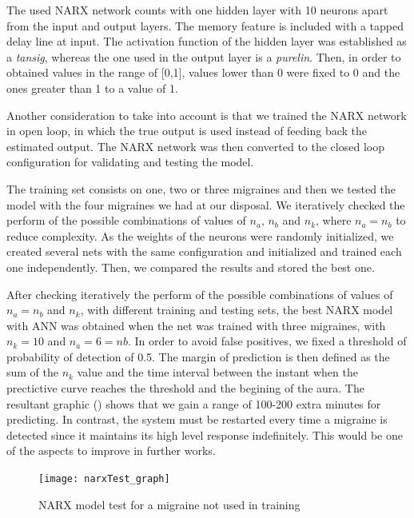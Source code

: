 The used NARX network counts with one hidden layer with 10 
neurons apart from the input and output layers. 
The memory feature is included with a tapped delay line at input. 
The activation function of the hidden layer was established as 
a \textit{tansig}, whereas the one used in the output layer is 
a \textit{purelin}. Then, in order to obtained values in the range of [0,1], values lower than 0 were fixed to 0 and the ones greater than 1 to a value of 1.

Another consideration to take into account is that we trained the 
NARX network in open loop, in which the true output is used instead 
of feeding back the estimated output. The NARX network was then 
converted to the closed loop configuration for validating and 
testing the model.

The training set consists on one, two or three migraines and then we tested the model with the four migraines we had at our disposal. 
We iteratively checked the perform  
of the possible combinations of values of 
$n_{a}$, $n_{b}$ and $n_{k}$, where $n_{a} = n_{b}$ to reduce
complexity. As the weights of the neurons were randomly initialized,
we created several nets with the same configuration and initialized
and trained each one independently. Then, we compared the results
and stored the best one.

After checking iteratively the perform  
of the possible combinations of values of 
$n_{a}=n_{b}$ and $n_{k}$, with different training and testing
sets, the best NARX model with ANN was obtained when the net was 
trained with three migraines, with $n_{k}=10$ and $n_{a}=6=n{b}$.
In order to avoid false positives, we fixed a threshold 
of probability of detection of 0.5. The margin of prediction is then 
defined as the sum of the $n_{k}$ value and the time interval 
between the instant when the prectictive curve reaches the threshold 
and the begining of the aura. The resultant graphic 
()
shows that we gain a range of 100-200 extra
minutes for predicting. In contrast, the system must be restarted
every time a migraine is detected since it maintains its high level 
response indefinitely. This would be one of the aspects to improve 
in further works.

\begin{figure}
\centering
\texttt{[image: narxTest\_graph]}
\caption{NARX model test for a migraine not used in training}
\label{fig:narxTest}
\end{figure}

